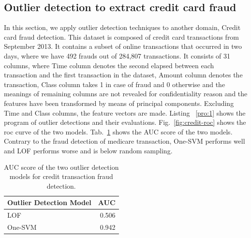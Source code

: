 \documentclass[dvipdfmx, english]{ampmt}             %
\newcommand{\Tabref}[1]{Tab.~\ref{#1}}
\newcommand{\Figref}[1]{Fig.~\ref{#1}}
\newcommand{\Listref}[1]{Listing ~\ref{#1}}
\begin{document}
%
%






\subsection{Outlier detection to extract credit card fraud}\label{sec:credit-card}
In this section, we apply outlier detection techniques to another domain, Credit card fraud detection\cite{CreditCard}. This dataset is composed of credit card transactions from September 2013.
It contains a subset of online transactions that occurred in two days, where we have 492 frauds out of 284,807 transactions. It consists of 31 columns, where Time column denotes the second
elapsed between each transaction and the first transaction in the dataset, Amount column denotes the transaction, Class column takes 1 in case of fraud and 0 otherwise and the meanings of
remaining columns are not revealed for confidentiality reason and the features have been transformed by means of principal components. 
Excluding Time and Class columns, the feature vectors are made. \Listref{pro:1} shows the program of outlier detections and their evaluations. \Figref{fig:credit-roc} shows the roc curve of the two models. 
\Tabref{tb:credit-auc} shows the AUC score of the two models. Contrary to the fraud detection of medicare transaction, One-SVM performs well and LOF performs worse and is below random
sampling.

\begin{table}[htb]
\centering
  \caption{AUC score of the two outlier detection models for credit transaction fraud detection.}
  \begin{tabular}{lr} \hline \hline
    Outlier Detection Model  & AUC \\ \hline
    LOF &  0.506 \\
    One-SVM &  0.942\\ \hline
   \end{tabular}
  \label{tb:credit-auc}
 \end{table}
\end{document}
